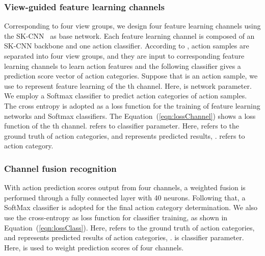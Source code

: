 \documentclass[journal]{IEEEtran}
\begin{document}
\subsubsection{View-guided feature learning channels}
Corresponding to four view groups, we design four feature learning channels using the SK-CNN~\cite{EnhancedSK2017} as base network. Each feature learning channel is composed of an SK-CNN backbone and one action classifier.
According to , action samples are separated into four view groups, and they are input to corresponding feature learning channels to learn action features and the following classifier gives a prediction score vector of action categories. Suppose that  is an action sample, we use  to represent feature learning of the th channel. Here,  is network parameter.
We employ a Softmax classifier to predict action categories of action samples. The cross entropy is adopted as a loss function for the training of feature learning networks and Softmax classifiers. The Equation~(\ref{eqn:lossChannel}) shows a loss function of the th channel.  refers to classifier parameter. Here,  refers to the ground truth of action categories, and  represents predicted results, .  refers to action category.



\subsubsection{Channel fusion recognition}
With action prediction scores output from four channels, a weighted fusion is performed through a fully connected layer with 40 neurons. Following that, a SoftMax classifier is adopted for the final action category determination. We also use the cross-entropy as loss function for classifier training, as shown in Equation~(\ref{eqn:lossClass}). Here,  refers to the ground truth of action categories, and  represents predicted results of action categories, .  is classifier parameter. Here,  is used to weight prediction scores of four channels.
\end{document}
